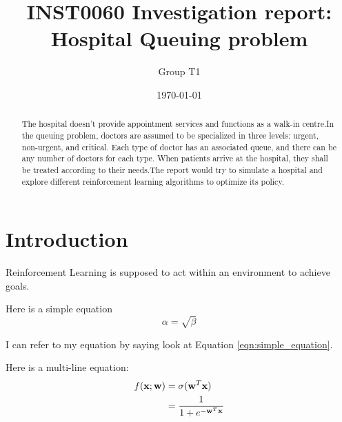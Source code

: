 \documentclass[11point]{article}
\renewcommand{\vec}[1]{\boldsymbol{\mathbf{#1}}}
\newcommand{\datapoint}{\vec{x}}
\newcommand{\weights}{\vec{w}}
\begin{document}
\title{INST0060 Investigation report:\\Hospital Queuing problem}
\author[*]{Group T1}
\date{\today}

\maketitle

\begin{abstract}
The hospital doesn't provide appointment services and functions as a walk-in centre.In the queuing problem, doctors are assumed to be specialized in three levels: urgent, non-urgent, and critical. Each type of doctor has an associated queue, and there can be any number of doctors for each type. When patients arrive at the hospital, they shall be treated according to their needs.The report would try to simulate a hospital and explore different reinforcement learning algorithms to optimize its policy.
\end{abstract}

\section{Introduction}
\label{sec:intro}

Reinforcement Learning is supposed to act within an environment to achieve goals.

Here is a simple equation
\begin{equation}
    \label{eqn:simple_equation}
    \alpha = \sqrt{ \beta }
\end{equation}

I can refer to my equation by saying look at Equation \eqref{eqn:simple_equation}.

Here is a multi-line equation:
\begin{align}
f(\datapoint; \weights)
& = \sigma(\weights^T\datapoint)
\label{eqn:logistic_regresion_decision_function} %
\\ %
& = \frac{1}{1+e^{-\weights^T\datapoint}}
\notag %
\end{align}
\end{document}
